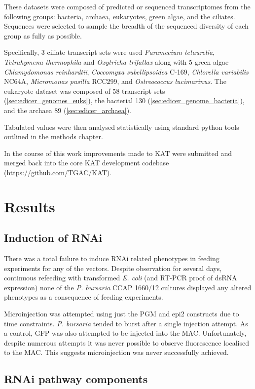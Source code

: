 These datasets were composed of predicted or sequenced transcriptomes 
from the following groups: bacteria, 
archaea, eukaryotes, green algae, and the ciliates.
Sequences were selected to sample the breadth of the sequenced
diversity of each group as fully as possible.

Specifically, 3 ciliate transcript sets were used \textit{Paramecium tetaurelia}, 
\textit{Tetrahymena thermophila} and \textit{Oxytricha trifallax} along with
5 green algae \textit{Chlamydomonas reinhardtii}, \textit{Coccomyxa subellipsoidea}
C-169, \textit{Chlorella variabilis} NC64A, \textit{Micromonas pusilla} RCC299, and
\textit{Ostreococcus lucimarinus}.
The eukaryote dataset was composed of 58 transcript
sets (\cref{sec:edicer_genomes_euks}),
the bacterial 130 (\cref{sec:edicer_genome_bacteria}), and 
the archaea 89 (\cref{sec:edicer_archaea}).

Tabulated values were then analysed statistically
using standard python tools outlined in the methods chapter.

In the course of this work improvements made to KAT were submitted and merged
back into the core KAT development codebase (\url{https://github.com/TGAC/KAT}).

\section{Results}

\subsection{Induction of RNAi}

There was a total failure to induce RNAi related phenotypes
in feeding experiments for any of the vectors. 
Despite observation for several days, continuous refeeding
with transformed \textit{E. coli} (and RT-PCR proof of dsRNA expression)
none of the \textit{P. bursaria} CCAP 1660/12 
cultures displayed any altered phenotypes as a consequence of feeding experiments. 


Microinjection was attempted using just the PGM and epi2 constructs due to
time constraints.
\textit{P. bursaria} tended to burst after a single injection attempt.
As a control, GFP was also attempted to be injected into the MAC.
Unfortunately, despite numerous attempts it was never possible
to observe fluorescence localised to the MAC. This suggests
microinjection was never successfully achieved. 

\subsection{RNAi pathway components}

